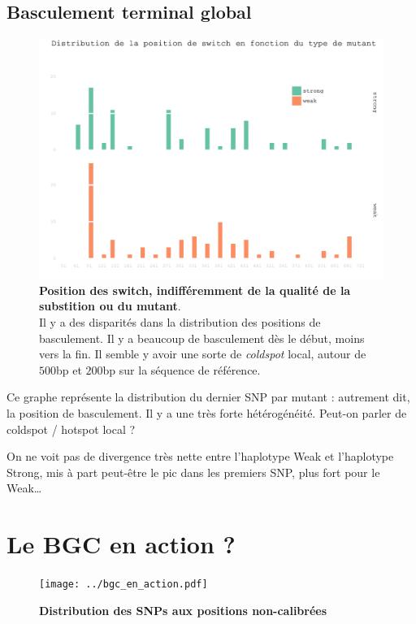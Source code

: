 \documentclass[a4paper]{tufte-handout}
\begin{document}
\subsection{Basculement terminal global}
\label{sec:orgheadline8}
\begin{figure}
  \centering
  \includegraphics[width=\linewidth]{../switch_distrib.pdf}
  \caption{\textbf{Position des switch, indifféremment de la qualité de la
      substition ou du mutant}. \\
    Il y a des disparités dans la distribution des positions de basculement. Il
    y a beaucoup de basculement dès le début, moins vers la fin. Il semble y
    avoir une sorte de \emph{coldspot} local, autour de $500$bp et $200$bp sur
    la séquence de référence. }
\end{figure}

Ce graphe représente la distribution du dernier SNP par mutant : autrement dit,
la position de basculement. Il y a une très forte hétérogénéité. Peut-on parler
de coldspot / hotspot local ?

On ne voit pas de divergence très nette entre l'haplotype Weak et l'haplotype
Strong, mis à part peut-être le pic dans les premiers SNP, plus fort pour le
Weak\ldots

\newpage
\section{Le BGC en action ?}
\label{sec:orgheadline10}

\begin{figure}
  \centering
  \texttt{[image: ../bgc\_en\_action.pdf]}
  \caption{\textbf{Distribution des SNPs aux positions non-calibrées}}
  \label{fig:bgcenaction}
\end{figure}
\end{document}
